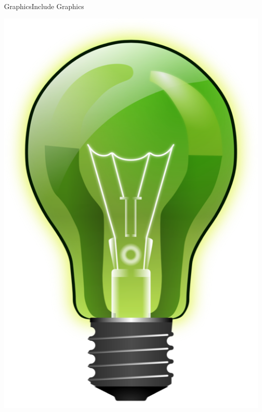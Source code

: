 \documentclass{bredelebeamer}
\begin{document}
\begin{frame}[fragile]{Graphics}{Include Graphics}
\begin{center}
\includegraphics[scale=0.2]{images/bulb}
\end{center}

\end{frame}
\end{document}
